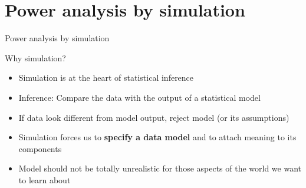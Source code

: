 \documentclass[aspectratio=169]{beamer}
\begin{document}
\section{Power analysis by simulation}

\begin{frame}{Power analysis by simulation}

Why simulation?\\[1ex]
\begin{itemize}
\item Simulation is at the heart of statistical inference

\item Inference: Compare the data with the output of a statistical model

\item If data look different from model output, reject model (or its
assumptions)

\item Simulation forces us to {\bf specify a data model} and to attach meaning
to its components

\item Model should not be totally unrealistic for those aspects of the world
we want to learn about
\end{itemize}

\end{frame}

\end{document}
